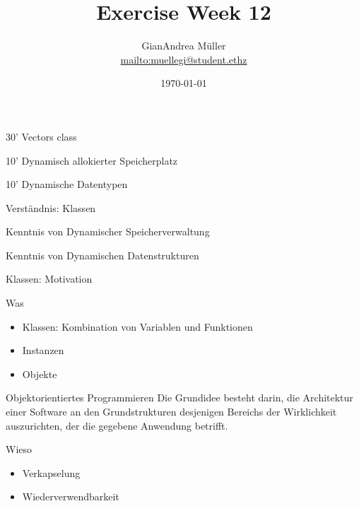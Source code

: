 \ifnum\conditionmacro=1 \documentclass[handout,usenames,dvipsnames]{beamer}\fi
\title{Exercise Week 12}
\author{GianAndrea Müller\\ \url{mailto:muellegi@student.ethz}}
\date{\today}
\begin{document}
\maketitle

\begin{TFTimeSchedule}
\item 30' Vectors class
\item 10' Dynamisch allokierter Speicherplatz
\item 10' Dynamische Datentypen
\end{TFTimeSchedule}

\begin{TFLearningObjectives}
\item Verständnis: Klassen
\item Kenntnis von Dynamischer Speicherverwaltung
\item Kenntnis von Dynamischen Datenstrukturen
\end{TFLearningObjectives}

\begin{frame}{Klassen: Motivation}
\begin{block}{Was}
\begin{itemize}
\item Klassen: Kombination von Variablen und Funktionen
\item Instanzen
\item Objekte
\end{itemize}
\end{block}

\begin{block}{Objektorientiertes Programmieren}
Die Grundidee besteht darin, die Architektur einer Software an den Grundstrukturen desjenigen Bereichs der Wirklichkeit auszurichten, der die gegebene Anwendung betrifft.
\end{block}

\begin{block}{Wieso}
\begin{itemize}
\item Verkapselung
\item Wiederverwendbarkeit
\end{itemize}
\end{block}

\end{frame}
\end{document}
